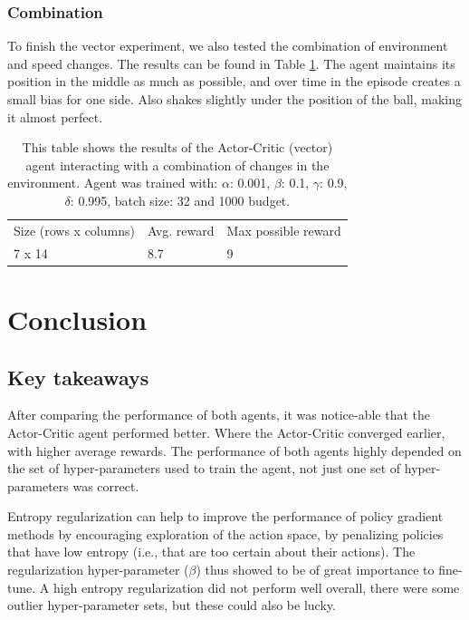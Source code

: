 \documentclass{article}
\begin{document}
\subsubsection{Combination}
To finish the vector experiment, we also tested the combination of environment and speed changes.
The results can be found in Table \ref{tab:Vector-comb}. 
The agent maintains its position in the middle as much as possible, and over time in the episode creates a small bias for one side. Also shakes slightly under the position of the ball, making it almost perfect. 

\begin{table}[]
\begin{tabular}{lll}
Size (rows x columns) & Avg. reward & Max possible reward \\
7 x 14                & 8.7         & 9                  
\end{tabular}
\caption{This table shows the results of the Actor-Critic (vector) agent interacting with a combination of changes in the environment. 
Agent was trained with: $\alpha$: 0.001, $\beta$: 0.1, $\gamma$: 0.9, $\delta$: 0.995, batch size: 32 and 1000 budget. }
\label{tab:Vector-comb}
\end{table}


\section{Conclusion}
\label{Conclusion}



\subsection{Key takeaways} %
\label{C-Takeaways}
After comparing the performance of both agents, it was notice-able that the Actor-Critic agent performed better. 
Where the Actor-Critic converged earlier, with higher average rewards.
The performance of both agents highly depended on the set of hyper-parameters used to train the agent, not just one set of hyper-parameters was correct. 

Entropy regularization can help to improve the performance of policy gradient methods by encouraging exploration of the action space, by penalizing policies that have low entropy (i.e., that are too certain about their actions).
The regularization hyper-parameter ($\beta$) thus showed to be of great importance to fine-tune. 
A high entropy regularization did not perform well overall, there were some outlier hyper-parameter sets, but these could also be lucky. 
\end{document}
